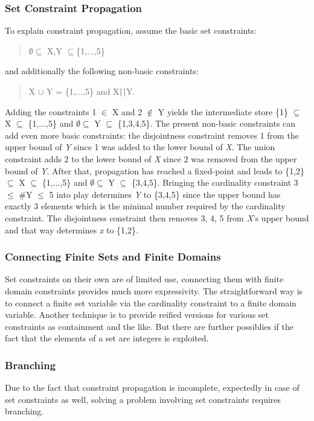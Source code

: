 \documentclass[a4paper]{scrartcl}
\begin{document}
\subsubsection{Set Constraint Propagation}
To explain constraint propagation, assume the basic 
set constraints: 
\begin{quote}
$\emptyset \subseteq$ X,Y $\subseteq$\{1,$\ldots$,5\}
\end{quote}
and additionally the following non-basic constraints:  
\begin{quote}
X $\cup$ Y = \{1,$\ldots$,5\} and X$|\thinspace|$Y.
\end{quote}
Adding the constraints 1 $\in$ X and 2 $\notin$ Y  yields 
the intermediate store \{1\} $\subseteq$ X $\subseteq$ \{1,$\ldots$,5\}
and $\emptyset \subseteq$ Y $\subseteq$ \{1,3,4,5\}. The 
present non-basic constraints can add even more basic 
constraints: the disjointness constraint removes 1 from 
the upper bound of {\it Y} since 1 was added to the lower bound 
of {\it X}. The union constraint adds 2 to the lower bound of  
{\it X} since 2 was removed from the upper bound of {\it Y}. 
After that, propagation has reached a fixed-point and leads to 
\{1,2\}$\subseteq$ X $\subseteq$ \{1,$\ldots$,5\} and 
$\emptyset \subseteq$ Y $\subseteq$ \{3,4,5\}. 
Bringing the cardinality constraint 3 $\le$ $\#$Y $\le$ 5  
into play determines {\it Y} to \{3,4,5\} since the upper 
bound has exactly 3 elements which is the minimal number 
required by the cardinality constraint. 
The disjointness constraint then removes 3, 4, 5 from {\it X}'s 
upper bound and that way determines {\it x} to \{1,2\}. 

\subsubsection{Connecting Finite Sets and Finite Domains}
Set constraints on their own are of limited use, connecting 
them with finite domain constraints provides much more 
expressivity. The straightforward way is to connect a finite 
set variable via the cardinality constraint to a finite 
domain variable. Another technique is to provide reified 
versions for various set constraints as containment and 
the like. But there are further possiblies if the fact 
that the elements of a set are integers is exploited. 


\subsubsection{Branching}
Due to the fact that constraint propagation is incomplete, 
expectedly in case of set constraints as well, solving a 
problem involving set constraints requires branching. 
\\
\end{document}
